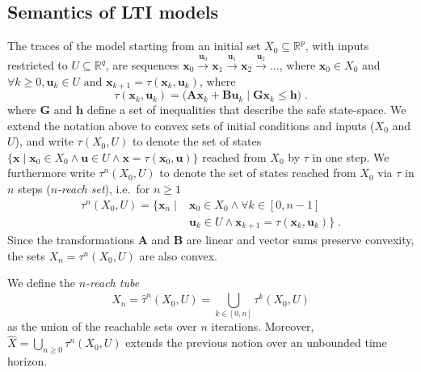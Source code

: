 \documentclass[sigconf]{llncs}
\newcommand{\mat}[1]{\boldsymbol{#1}}
\renewcommand{\vec}[1]{\boldsymbol{#1}}
\begin{document}
\subsection{Semantics of LTI models}\label{sec:model_semantics}
%
The traces of the model starting from an initial set $X_0\subseteq \mathbb{R}^p$, 
with inputs restricted to $U \subseteq \mathbb{R}^q$, are sequences 
$ \vec{x}_0 \xrightarrow{\vec{u}_0} \vec{x}_1 \xrightarrow{\vec{u}_1} \vec{x}_2 \xrightarrow{\vec{u}_2} \ldots $, 
%
where $ \vec{x}_0 \in X_0$ and $\forall k\geq 0, \vec{u}_k \in U \text{ and } \vec{x}_{k+1} = \tau(\vec{x}_k,\vec{u}_k) $, 
where 
%
\begin{equation}\label{equ:reachtraj}
\tau(\vec{x}_k,\vec{u}_k) = 
\big( \mat{A}\vec{x}_k +
\mat{B}\vec{u}_k \mid \mat{G}\vec{x}_k \leq \vec{h}\big)\;. 
\end{equation}
%
where $\mat{G}$ and $\vec{h}$ define a set of inequalities that describe the safe state-space.
%
We extend the notation above to convex sets of initial conditions and inputs ($X_0$ and $U$), 
and write $\tau(X_0,U)$ to denote the set of states $\{\vec{x} \mid \vec{x}_0 \in
X_0 \wedge \vec{u} \in U \wedge \vec{x} = \tau(\vec{x}_0,\vec{u})\}$
reached from $X_0$ by $\tau$ in one step. 
%
We furthermore write $\tau^n(X_0,U)$ to denote the set of states reached from
$X_0$ via $\tau$ in $n$ steps (\emph{$n$-reach set}), i.e.\ for $n\geq 1$
%
\begin{align}\label{equ:reachset}
\tau^n(X_0,U) = \{\vec{x}_n \mid &\vec{x}_0 \in X_0 \wedge \forall k\in [0,n-1]\nonumber\\ 
 &\vec{u}_{k} \in U \wedge \vec{x}_{k+1}=\tau(\vec{x}_{k},\vec{u}_{k}) \} \;. 
\end{align}
%
Since the transformations $\mat{A}$ and $\mat{B}$ are linear and
vector sums preserve convexity, the sets $X_n = \tau^n(X_0,U)$ are also
convex.

We define the \emph{$n$-reach tube} 
\begin{equation}\label{equ:reachtube}
\hat{X}_n=\hat{\tau}^n(X_0,U)=\bigcup_{k\in[0,n]} \tau^k(X_0,U)
\end{equation}
as the union of the reachable sets over $n$ iterations.
%
Moreover, $\hat{X} 
=\bigcup_{n\geq 0} \tau^n(X_0,U)$ 
extends the previous notion over an 
unbounded time horizon.

\end{document}
